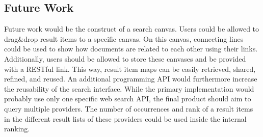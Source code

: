 \subsection{Future Work}
Future work would be the construct of a search canvas. Users could be allowed to drag\&drop result items to a specific canvas. On this canvas, connecting lines could be used to show how documents are related to each other using their links. Additionally, users should be allowed to store these canvases and be provided with a RESTful link. This way, result item maps can be easily retrieved, shared, refined, and reused. An additional programming API would furthermore increase the reusability of the search interface. While the primary implementation would probably use only one specific web search API, the final product should aim to query multiple providers. The number of occurrences and rank of a result items in the different result lists of these providers could be used inside the internal ranking.